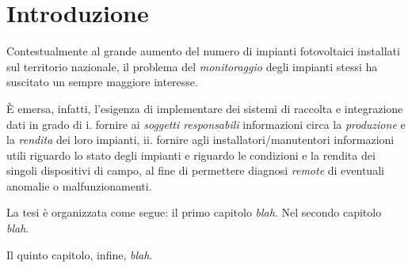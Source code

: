 \clearpage{\pagestyle{empty}\cleardoublepage}
\chapter*{Introduzione} 
%

%
Contestualmente al grande aumento del numero di impianti 
fotovoltaici installati sul territorio nazionale\cite{gse2010}, 
il problema del \emph{monitoraggio} degli impianti stessi ha 
suscitato un sempre maggiore interesse.
%

%
\`E emersa, infatti, l'esigenza di implementare dei sistemi 
di raccolta e integrazione dati in grado di 
i. fornire ai \emph{soggetti responsabili} informazioni 
circa la \emph{produzione} e la \emph{rendita} dei loro impianti, 
ii. fornire agli installatori/manutentori informazioni utili 
riguardo lo stato degli impianti e riguardo le condizioni e la 
rendita dei singoli dispositivi di campo, al fine di permettere 
diagnosi \emph{remote} di eventuali anomalie o malfunzionamenti.
%

%

%
La tesi \`e organizzata come segue: il primo capitolo \emph{blah}.
Nel secondo capitolo \emph{blah}.
%

%
Il quinto capitolo, infine, \emph{blah}.
